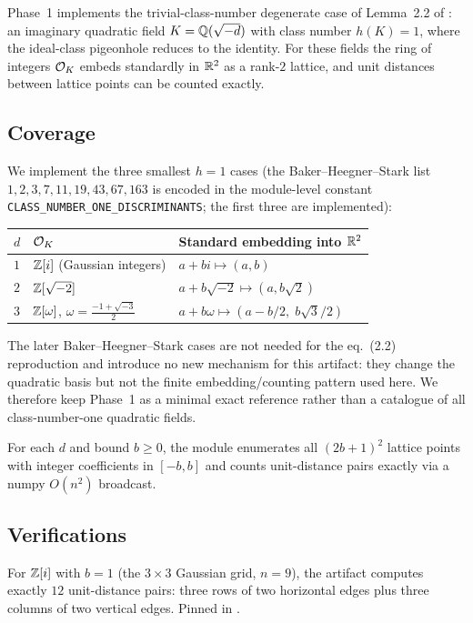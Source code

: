 
Phase~1 implements the trivial-class-number degenerate case of Lemma~2.2
of \cite{OpenAI2026Proof}: an imaginary quadratic field $K = \mathbb{Q}(\sqrt{-d})$
with class number $h(K) = 1$, where the ideal-class pigeonhole reduces to
the identity. For these fields the ring of integers $\mathcal{O}_K$ embeds
standardly in $\mathbb{R}^2$ as a rank-$2$ lattice, and unit distances between
lattice points can be counted exactly.

\subsection{Coverage}

We implement the three smallest $h = 1$ cases (the Baker--Heegner--Stark
list \(1, 2, 3, 7, 11, 19, 43, 67, 163\) is encoded in the module-level
constant \texttt{CLASS\_NUMBER\_ONE\_DISCRIMINANTS}; the first three are
implemented):

\begin{tabular}{lll}
\toprule
$d$ & $\mathcal{O}_K$ & Standard embedding into $\mathbb{R}^2$ \\
\midrule
$1$ & $\mathbb{Z}[i]$ (Gaussian integers)     & $a + bi \mapsto (a, b)$ \\
$2$ & $\mathbb{Z}[\sqrt{-2}]$                 & $a + b\sqrt{-2} \mapsto (a, b\sqrt{2})$ \\
$3$ & $\mathbb{Z}[\omega]$, $\omega = \frac{-1 + \sqrt{-3}}{2}$ & $a + b\omega \mapsto (a - b/2,\; b\sqrt{3}/2)$ \\
\bottomrule
\end{tabular}

\medskip
The later Baker--Heegner--Stark cases are not needed for the
eq.~(2.2) reproduction and introduce no new mechanism for this
artifact: they change the quadratic basis but not the finite
embedding/counting pattern used here. We therefore keep Phase~1 as a
minimal exact reference rather than a catalogue of all class-number-one
quadratic fields.

For each $d$ and bound $b \geq 0$, the module enumerates all
$(2b+1)^2$ lattice points with integer coefficients in $[-b, b]$
and counts unit-distance pairs exactly via a numpy $O(n^2)$
broadcast.

\subsection{Verifications}

\begin{verification}\label{ver:gauss_3x3}
For $\mathbb{Z}[i]$ with $b = 1$ (the $3 \times 3$ Gaussian grid, $n = 9$),
the artifact computes exactly $12$ unit-distance pairs: three rows of two
horizontal edges plus three columns of two vertical edges. Pinned in
.
\end{verification}

